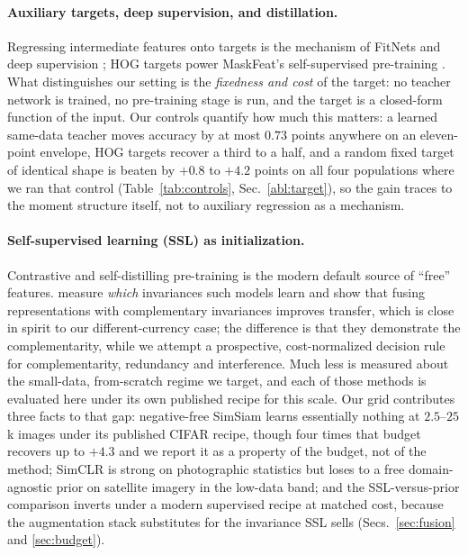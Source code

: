\paragraph{Auxiliary targets, deep supervision, and distillation.}
 Regressing intermediate features onto targets is the mechanism of
FitNets \citep{romero2015fitnets} and deep supervision \citep{lee2015deeply};
HOG targets power MaskFeat's self-supervised pre-training
\citep{wei2022maskfeat}. What distinguishes our setting is the \emph{fixedness
and cost} of the target: no teacher network is trained, no pre-training stage
is run, and the target is a closed-form function of the input. Our controls
quantify how much this matters: a learned same-data teacher moves accuracy by
at most $0.73$ points anywhere on an eleven-point envelope, HOG targets
recover a third to a half, and a random fixed target of identical shape is
beaten by $+0.8$ to $+4.2$ points on all four populations where we ran
that control (Table~\ref{tab:controls}, Sec.~\ref{abl:target}), so the
gain traces to the moment structure itself, not to auxiliary
regression as a mechanism.

\paragraph{Self-supervised learning (SSL) as initialization.} Contrastive and
self-distilling pre-training
\citep{chen2020simclr,chen2021simsiam,caron2021dino} is the modern default
source of ``free'' features. \citet{ericsson2022why} measure \emph{which}
invariances such models learn and show that fusing representations with
complementary invariances improves transfer, which is close in spirit to our
different-currency case; the difference is that they demonstrate the
complementarity, while we attempt a prospective, cost-normalized decision rule
for complementarity, redundancy and interference. Much less is measured about
the small-data,
from-scratch regime we target, and each of those methods is evaluated here
under its own published recipe for this scale. Our
grid contributes three facts to that gap: negative-free SimSiam learns
essentially nothing at $2.5$--$25$k images under its published CIFAR recipe,
though four times that budget recovers up to $+4.3$ and we report it as a
property of the budget, not of the method; SimCLR is strong on
photographic statistics but loses to a free domain-agnostic prior on satellite
imagery in the low-data band; and the SSL-versus-prior comparison inverts under
a modern supervised recipe at matched cost, because the augmentation stack
substitutes for the invariance SSL sells (Secs.~\ref{sec:fusion} and
\ref{sec:budget}).

